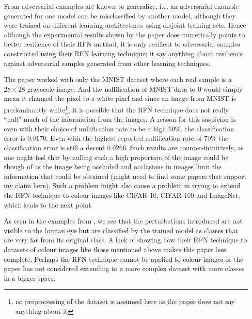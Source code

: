 \documentclass[a4paper,10pt,leqno]{article}
\theoremstyle{definition}
\begin{document}
From \cite{goodfellow2014explaining} adversarial examples are known to generalize, i.e. an adversarial example generated for one model can be misclassified by another model, although they were trained on different learning architectures using disjoint training sets. Hence although the experimental results shown by the paper does numerically points to better resilience of their RFN method, it is only resilient to adversarial samples constructed using their RFN learning technique; it say anything about resilience against adversarial samples generated from other learning techniques. 


The paper worked with only the MNIST dataset where each real sample is a $28 \times  28$ grayscale image. And the nullification of MNIST data to 0 would simply mean it changed the pixel to a white pixel and since an image from MNIST is predominantly white\footnote{no preprocessing of the dataset is assumed here as the paper does not say anything about it}, it is possible that the RFN technique does not really ``null'' much of the information from the images. A reason for this suspicion is even with their choice of nullification rate to be a high $50\%$, the classification error is 0.0170. Even with the highest reported nullification rate of $70\%$ the classification error is still  a decent 0.0266. Such results are counter-intuitively, as one might feel that by nulling such a high proportion of the image could be though of as the image being occluded and occlusions in images limit the information that could be obtained (might need to find some papers that support my claim here). Such a problem might also cause a problem in trying to extend the RFN technique to colour images like CIFAR-10, CIFAR-100 and ImageNet, which leads to the next point.

As seen in the examples from \cite{szegedy2013intriguing}, we see that the perturbations introduced are not visible to the human eye but are classified by the trained model as classes that are very far from its original class. A lack of showing how their RFN technique to datasets of colour images like those mentioned above makes this paper less complete. Perhaps the RFN technique cannot be applied to colour images or the paper has not considered extending to a more complex dataset with more classes in a bigger space. 


%
\end{document}
